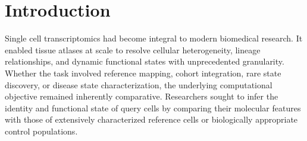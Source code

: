 \documentclass[11pt]{article}
\begin{document}
\section*{Introduction}
Single cell transcriptomics had become integral to modern biomedical research\cite{Regev2017HCA,Luecken2019BestPractices,Amezquita2020Orchestrating,Lahnemann2020Challenges,Kiselev2019Challenges}. It enabled tissue atlases at scale\cite{Regev2017HCA} to resolve cellular heterogeneity\cite{Trapnell2015CellTypesStates}, lineage relationships, and dynamic functional states\cite{Mincarelli2018CellIdentity} with unprecedented granularity. Whether the task involved reference mapping, cohort integration, rare state discovery, or disease state characterization, the underlying computational objective remained inherently comparative\cite{Kiselev2019Challenges,Lahnemann2020Challenges,Heumos2023BestPractices}. Researchers sought to infer the identity and functional state of query cells by comparing their molecular features with those of extensively characterized reference cells or biologically appropriate control populations\cite{Aran2019SingleR,Stuart2019Seurat,Hao2021Multimodal,DominguezConde2022CellTypist,Abdelaal2019ComparisonAnnotation,Pasquini2021AnnotationReview}.
\end{document}
